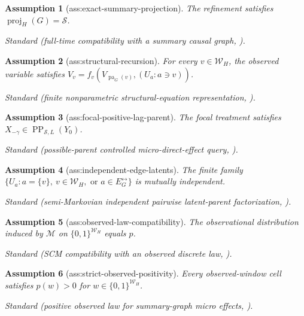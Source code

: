 \documentclass{article}
\newtheorem{assumption}{Assumption}
\begin{document}
\begin{assumption}[ass:exact-summary-projection]\label{ass:exact-summary-projection}
The refinement satisfies \(\operatorname{proj}_H(G)=\mathcal S\).
\par\smallskip\noindent\emph{Standard} (full-time compatibility with a summary causal graph, \cite{FerreiraAssaad2026}).
\end{assumption}

\begin{assumption}[ass:structural-recursion]\label{ass:structural-recursion}
For every \(v\in\mathcal W_H\), the observed variable satisfies \(V_v=f_v(V_{\operatorname{pa}_G(v)},(U_a:a\ni v))\).
\par\smallskip\noindent\emph{Standard} (finite nonparametric structural-equation representation, \cite{DuarteEtAl2024}).
\end{assumption}

\begin{assumption}[ass:focal-positive-lag-parent]\label{ass:focal-positive-lag-parent}
The focal treatment satisfies \(X_{-\gamma}\in\operatorname{PP}_{\mathcal S,L}(Y_0)\).
\par\smallskip\noindent\emph{Standard} (possible-parent controlled micro-direct-effect query, \cite{FerreiraAssaad2026}).
\end{assumption}

\begin{assumption}[ass:independent-edge-latents]\label{ass:independent-edge-latents}
The finite family \(\{U_a:a=\{v\},\ v\in\mathcal W_H,\text{ or }a\in E_G^{\leftrightarrow}\}\) is mutually independent.
\par\smallskip\noindent\emph{Standard} (semi-Markovian independent pairwise latent-parent factorization, \cite{Evans2016}).
\end{assumption}

\begin{assumption}[ass:observed-law-compatibility]\label{ass:observed-law-compatibility}
The observational distribution induced by \(\mathcal M\) on \(\{0,1\}^{\mathcal W_H}\) equals \(p\).
\par\smallskip\noindent\emph{Standard} (SCM compatibility with an observed discrete law, \cite{DuarteEtAl2024}).
\end{assumption}

\begin{assumption}[ass:strict-observed-positivity]\label{ass:strict-observed-positivity}
Every observed-window cell satisfies \(p(w)>0\) for \(w\in\{0,1\}^{\mathcal W_H}\).
\par\smallskip\noindent\emph{Standard} (positive observed law for summary-graph micro effects, \cite{FerreiraAssaad2026}).
\end{assumption}
\end{document}
